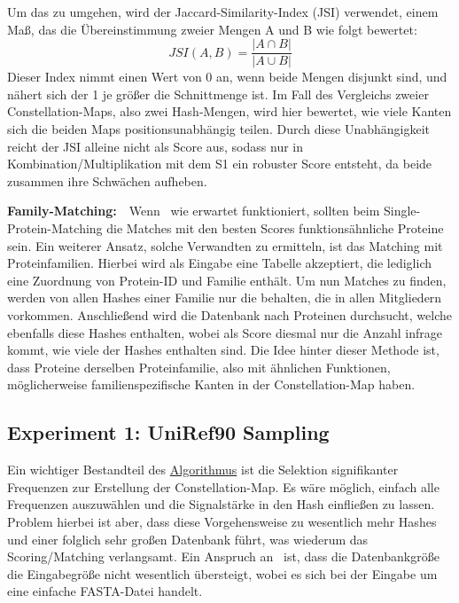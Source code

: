         Um das zu umgehen, wird der Jaccard-Similarity-Index (JSI) verwendet, einem Maß, das die Übereinstimmung zweier Mengen A und B wie folgt bewertet:
        $$JSI(A, B)=\frac{|A \cap B|}{|A \cup B|}$$
        Dieser Index nimmt einen Wert von 0 an, wenn beide Mengen disjunkt sind, und nähert sich der 1 je größer die Schnittmenge ist. Im Fall des Vergleichs zweier Constellation-Maps, also zwei Hash-Mengen, wird hier bewertet, wie viele Kanten sich die beiden Maps positionsunabhängig teilen. Durch diese Unabhängigkeit reicht der JSI alleine nicht als Score aus, sodass nur in Kombination/Multiplikation mit dem S1 ein robuster Score entsteht, da beide zusammen ihre Schwächen aufheben.

        \vspace{2.25mm}
        \textbf{Family-Matching:}\ \ Wenn \protfin\ wie erwartet funktioniert, sollten beim Single-Protein-Matching die Matches mit den besten Scores funktionsähnliche Proteine sein. Ein weiterer Ansatz, solche Verwandten zu ermitteln, ist das Matching mit Proteinfamilien. Hierbei wird als Eingabe eine Tabelle akzeptiert, die lediglich eine Zuordnung von Protein-ID und Familie enthält. Um nun Matches zu finden, werden von allen Hashes einer Familie nur die behalten, die in allen Mitgliedern vorkommen. Anschließend wird die Datenbank nach Proteinen durchsucht, welche ebenfalls diese Hashes enthalten, wobei als Score diesmal nur die Anzahl infrage kommt, wie viele der Hashes enthalten sind. Die Idee hinter dieser Methode ist, dass Proteine derselben Proteinfamilie, also mit ähnlichen Funktionen, möglicherweise familienspezifische Kanten in der Constellation-Map haben.
    \subsection{Experiment 1: UniRef90 Sampling} %
        \label{sub:experiment_1_uniref90_sampling}
        Ein wichtiger Bestandteil des \hyperref[sec:grundalgorithmus]{Algorithmus} ist die Selektion signifikanter Frequenzen zur Erstellung der Constellation-Map. Es wäre möglich, einfach alle Frequenzen auszuwählen und die Signalstärke in den Hash einfließen zu lassen. Problem hierbei ist aber, dass diese Vorgehensweise zu wesentlich mehr Hashes und einer folglich sehr großen Datenbank führt, was wiederum das Scoring/Matching verlangsamt. Ein Anspruch an \protfin\ ist, dass die Datenbankgröße die Eingabegröße nicht wesentlich übersteigt, wobei es sich bei der Eingabe um eine einfache FASTA-Datei handelt.


